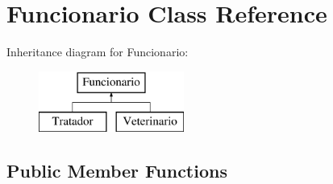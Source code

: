 \hypertarget{class_funcionario}{}\section{Funcionario Class Reference}
\label{class_funcionario}
Inheritance diagram for Funcionario\+:\begin{figure}[H]
\begin{center}
\leavevmode
\includegraphics[height=2.000000cm]{class_funcionario}
\end{center}
\end{figure}
\subsection*{Public Member Functions}
